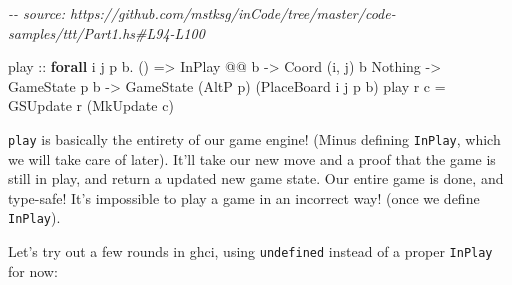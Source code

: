 \documentclass[]{article}
\newenvironment{Shaded}{}{}
\newcommand{\CommentTok}[1]{\textcolor[rgb]{0.38,0.63,0.69}{\textit{#1}}}
\newcommand{\DataTypeTok}[1]{\textcolor[rgb]{0.56,0.13,0.00}{#1}}
\newcommand{\KeywordTok}[1]{\textcolor[rgb]{0.00,0.44,0.13}{\textbf{#1}}}
\newcommand{\NormalTok}[1]{#1}
\newcommand{\OperatorTok}[1]{\textcolor[rgb]{0.40,0.40,0.40}{#1}}
\newcommand{\OtherTok}[1]{\textcolor[rgb]{0.00,0.44,0.13}{#1}}
\begin{document}
\begin{Shaded}
\begin{Highlighting}[]
\CommentTok{{-}{-} source: https://github.com/mstksg/inCode/tree/master/code{-}samples/ttt/Part1.hs\#L94{-}L100}

\NormalTok{play}
\OtherTok{    ::} \KeywordTok{forall}\NormalTok{ i j p b}\OperatorTok{.}\NormalTok{ ()}
    \OtherTok{=>} \DataTypeTok{InPlay} \OperatorTok{@@}\NormalTok{ b}
    \OtherTok{{-}>} \DataTypeTok{Coord}\NormalTok{ \textquotesingle{}(i, j) b }\DataTypeTok{\textquotesingle{}Nothing}
    \OtherTok{{-}>} \DataTypeTok{GameState}\NormalTok{ p b}
    \OtherTok{{-}>} \DataTypeTok{GameState}\NormalTok{ (}\DataTypeTok{AltP}\NormalTok{ p) (}\DataTypeTok{PlaceBoard}\NormalTok{ i j p b)}
\NormalTok{play r c }\OtherTok{=} \DataTypeTok{GSUpdate}\NormalTok{ r (}\DataTypeTok{MkUpdate}\NormalTok{ c)}
\end{Highlighting}
\end{Shaded}

\texttt{play} is basically the entirety of our game engine! (Minus defining
\texttt{InPlay}, which we will take care of later). It'll take our new move and
a proof that the game is still in play, and return a updated new game state. Our
entire game is done, and type-safe! It's impossible to play a game in an
incorrect way! (once we define \texttt{InPlay}).

Let's try out a few rounds in ghci, using \texttt{undefined} instead of a proper
\texttt{InPlay} for now:
\end{document}
